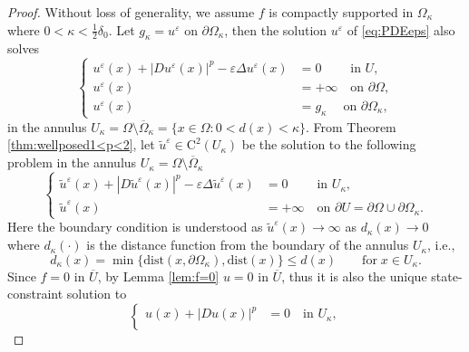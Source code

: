 \documentclass[11pt,reqno]{amsart}
\numberwithin{figure}{section}
\theoremstyle{plain}
\theoremstyle{remark}
\numberwithin{equation}{section}
\begin{document}
\begin{proof} Without loss of generality, we assume $f$ is compactly supported in $\Omega_{\kappa}$ where $0<\kappa < \frac{1}{2}\delta_0$. Let $g_\kappa = u^\varepsilon$ on $\partial\Omega_{\kappa}$, then the solution $u^\varepsilon$ of \eqref{eq:PDEeps} also solves
\begin{equation*}
    \left\{
  \begin{aligned}
  u^\varepsilon(x) + |Du^\varepsilon(x)|^p-\varepsilon \Delta u^\varepsilon(x) &=0 \;\qquad \text{in } U ,\\
  u^\varepsilon(x) &= +\infty \quad \text{on } \partial \Omega,\\
  u^\varepsilon(x) &= g_\kappa \;\quad \text{on } \partial \Omega_{\kappa},
    \end{aligned}
\right.
\end{equation*}
in the annulus $U_\kappa= \Omega \setminus \overline{\Omega}_{\kappa} = \{x\in \Omega: 0< d(x) < \kappa\}$. From Theorem \ref{thm:wellposed1<p<2}, let $\tilde{u}^\varepsilon\in \mathrm{C}^2(U_\kappa)$ be the solution to the following problem in the annulus $U_\kappa= \Omega \setminus \overline{\Omega}_{\kappa}$
\begin{equation*}
    \left\{
        \begin{aligned}
            \tilde{u}^\varepsilon(x) + |D\tilde{u}^\varepsilon(x)|^p-\varepsilon \Delta \tilde{u}^\varepsilon(x) &=0 \;\qquad \text{in } U_\kappa ,\\
            \tilde{u}^\varepsilon(x) &= +\infty \quad \text{on } \partial U = \partial \Omega\cup \partial \Omega_{\kappa}.
        \end{aligned}
    \right.
\end{equation*}
Here the boundary condition is understood as $\tilde{u}^\varepsilon(x)\to \infty$ as $d_\kappa(x)\to 0$ where $d_\kappa(\cdot)$ is the distance function from the boundary of the annulus $U_\kappa$, i.e.,
\begin{equation*}
    d_\kappa(x) = \min \big\lbrace \mathrm{dist}(x,\partial \Omega_\kappa),\mathrm{dist}(x)  \big\rbrace \leq d(x) \qquad\text{for}\;x\in U_\kappa.
\end{equation*}
Since $f = 0$ in $\overline{U}$, by Lemma \ref{lem:f=0} $u=0$ in $\overline{U}$, thus it is also the unique state-constraint solution to
\begin{equation*}
    \left\{
        \begin{aligned}
            u(x)+ |Du(x)|^p &=0 \quad \text{in } U_\kappa ,\\

\end{aligned}
\end{equation*}
\end{proof}
\end{document}
